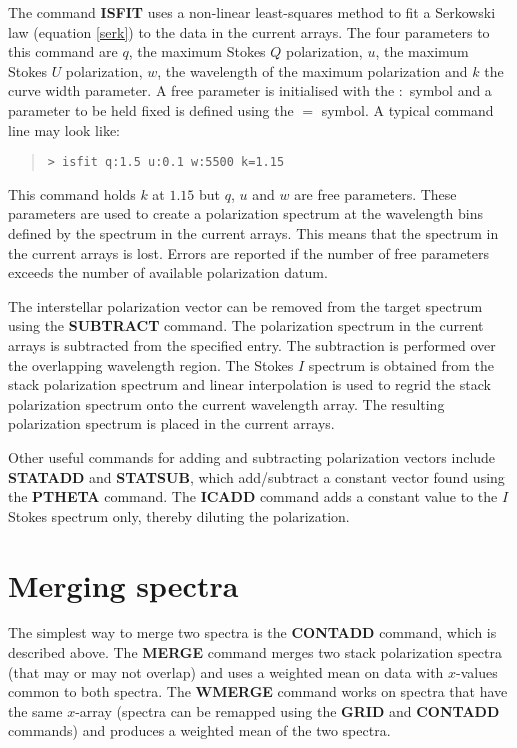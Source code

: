 The command {\bf ISFIT} uses a non-linear least-squares method to fit
a Serkowski law (equation \ref{serk}) to the data in the current
arrays. The four parameters to this command are $q$, the maximum
Stokes $Q$ polarization, $u$, the maximum Stokes $U$ polarization,
$w$, the wavelength of the maximum polarization and $k$ the curve
width parameter. A free parameter is initialised with the $:$ symbol
and a parameter to be held fixed is defined using the $=$ symbol. A
typical command line may look like:

\begin{quote}
{\tt  > isfit q:1.5 u:0.1 w:5500 k=1.15}
\end{quote}

This command holds $k$ at $1.15$ but $q$, $u$  and $w$ are free
parameters. These parameters are used to create a polarization spectrum
at the wavelength bins defined by the spectrum in the current arrays.
This means that the spectrum in the current arrays is lost.  Errors are
reported if the number of free parameters exceeds the number of
available polarization datum.

The interstellar polarization vector can be removed from the target
spectrum using the {\bf SUBTRACT} command. The polarization spectrum
in the current arrays is subtracted from the specified entry. The
subtraction is performed over the overlapping wavelength region. The
Stokes $I$ spectrum is obtained from the stack polarization spectrum
and linear interpolation is used to regrid the stack polarization
spectrum onto the current wavelength array. The resulting polarization
spectrum is placed in the current arrays.

Other useful commands for adding and subtracting polarization vectors
include {\bf STATADD} and {\bf STATSUB}, which add/subtract a
constant vector found using the {\bf PTHETA} command. The {\bf ICADD}
command adds a constant value to the $I$ Stokes spectrum only, thereby
diluting the polarization.

\section{Merging spectra}

The simplest way to merge two spectra is the {\bf CONTADD} command,
which is described above. The {\bf MERGE} command merges two stack
polarization spectra (that may or may not overlap) and uses a weighted
mean on data with $x$-values common to both spectra. The {\bf WMERGE}
command works on spectra that have the same $x$-array (spectra can be
remapped using  the {\bf GRID} and {\bf CONTADD} commands) and
produces a weighted mean of the two spectra.

